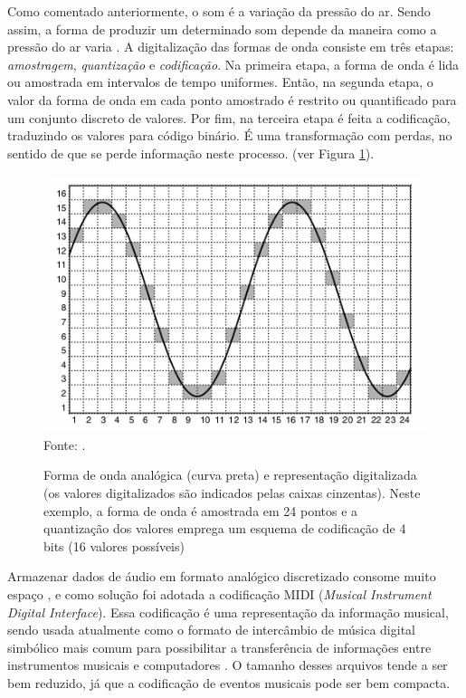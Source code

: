 Como comentado anteriormente, o som é a variação da pressão do ar. Sendo assim, a forma de produzir um determinado som depende da maneira como a pressão do ar varia \cite{miletto2004}. A digitalização das formas de onda consiste em três etapas: \textit{amostragem}, \textit{quantização} e \textit{codificação}. Na primeira etapa, a forma de onda é lida ou amostrada em intervalos de tempo uniformes. Então, na segunda etapa, o valor da forma de onda em cada ponto amostrado é restrito ou quantificado para um conjunto discreto de valores. Por fim, na terceira etapa é feita a codificação, traduzindo os valores para código binário. É uma transformação com perdas, no sentido de que se perde informação neste processo. (ver Figura \ref{fig:ondaAnalog}).

\begin{figure}[!htb]
   \centering
   \caption{Forma de onda analógica (curva preta) e representação digitalizada (os valores digitalizados são indicados pelas caixas cinzentas). Neste exemplo, a forma de onda é amostrada em 24 pontos e a quantização dos valores emprega um esquema de codificação de 4 bits (16 valores possíveis)}\label{fig:ondaAnalog} 
   \includegraphics[scale=0.9]{figuras/ondaAnalog.png}
   \\Fonte: \cite{muller2007}.
\end{figure}

Armazenar dados de áudio em formato analógico discretizado consome muito espaço \cite{juliana2004}, e como solução foi adotada a codificação MIDI (\textit{Musical Instrument Digital Interface}). Essa codificação é uma representação da informação musical, sendo usada atualmente como o formato de intercâmbio de música digital simbólico mais comum para possibilitar a transferência de informações entre instrumentos musicais e computadores \cite{muller2007}. O tamanho desses arquivos tende a ser bem reduzido, já que a codificação de eventos musicais pode ser bem compacta.

